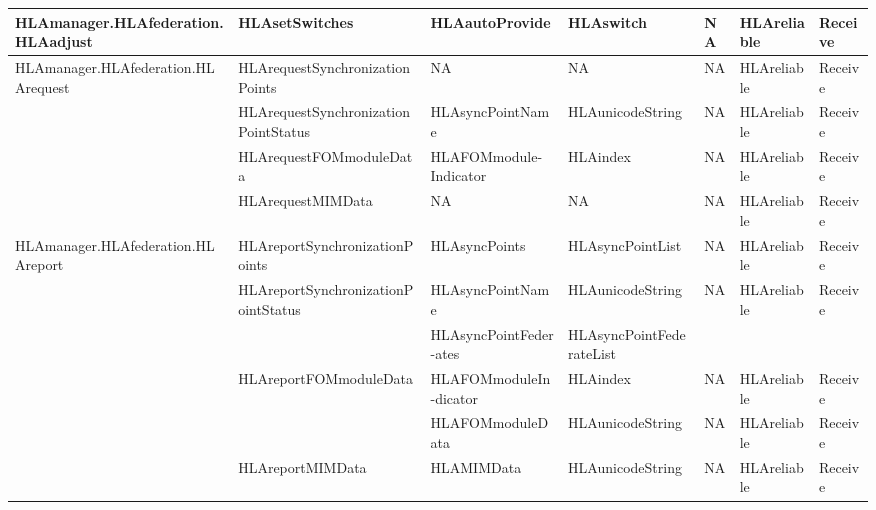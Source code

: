 \begin{landscape}
\begin{momtabletypeset}[8.00]
{{\begin{tabular}{|Y{116.98pt}|Y{137.54pt}|Y{76.22pt}|Y{103.88pt}|Y{65.90pt}|Y{66.32pt}|Y{38.59pt}|}
                    HLAmanager.\allowbreak{}HLAfederation.\allowbreak{}\newline HLAadjust  & HLAsetSwitches & HLAautoProvide & HLAswitch & NA & HLAreliable & Receive \\
                    \hline
                    HLAmanager.\allowbreak{}HLAfederation.\allowbreak{}\newline HLArequest & HLArequestSynchronizationPoints & NA & NA & NA & HLAreliable & Receive \\
                    & HLArequestSynchronizationPointStatus & HLAsyncPointName                & HLAunicodeString         & NA & HLAreliable & Receive \\
                    & HLArequestFOMmoduleData              & HLAFOMmodule-\newline Indicator & HLAindex                 & NA & HLAreliable & Receive \\
                    & HLArequestMIMData                    & NA                              & NA                       & NA & HLAreliable & Receive \\
                    \hline
                    HLAmanager.\allowbreak{}HLAfederation.\allowbreak{}\newline HLAreport  & HLAreportSynchronizationPoints & HLAsyncPoints & HLAsyncPointList & NA & HLAreliable & Receive \\
                    & HLAreportSynchronizationPointStatus  & HLAsyncPointName                & HLAunicodeString         & NA & HLAreliable & Receive \\
                    &                                      & HLAsyncPointFeder-\newline ates & HLAsyncPointFederateList &    &             &         \\
                    & HLAreportFOMmoduleData               & HLAFOMmoduleIn-\newline dicator & HLAindex                 & NA & HLAreliable & Receive \\
                    &                                      & HLAFOMmoduleData                & HLAunicodeString         & NA & HLAreliable & Receive \\
                    & HLAreportMIMData                     & HLAMIMData                      & HLAunicodeString         & NA & HLAreliable & Receive \\
                    \hline
                \end{tabular}%
            }%
        }%
    \end{momtabletypeset}
    \newpage


\end{landscape}
